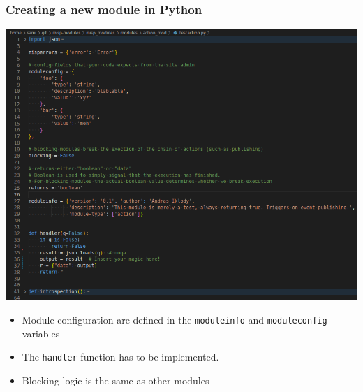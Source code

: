 \begin{frame}
    \frametitle{Creating a new module in Python}
    \begin{center}
        \includegraphics[width=0.6\linewidth]{pictures/custom-2.png}
    \end{center}

    \begin{itemize}
        \item Module configuration are defined in the \texttt{moduleinfo} and \texttt{moduleconfig} variables
        \item The \texttt{handler} function has to be implemented.
        \item Blocking logic is the same as other modules
    \end{itemize}
\end{frame}

